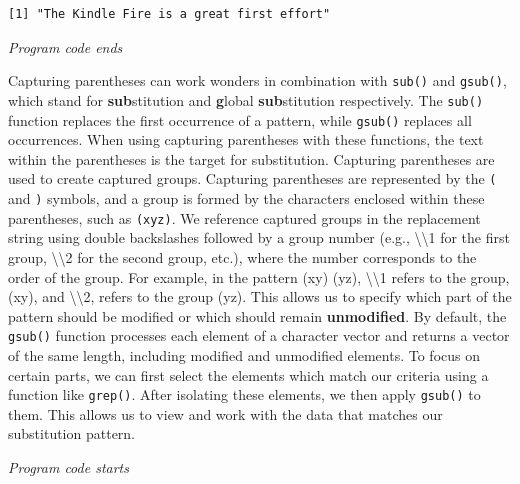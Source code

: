 \begin{verbatim}
[1] "The Kindle Fire is a great first effort"
\end{verbatim}

\emph{Program code ends}

Capturing parentheses can work wonders in combination with
\texttt{sub()} and \texttt{gsub()}, which stand for
\textbf{sub}stitution and \textbf{g}lobal \textbf{sub}stitution
respectively. The \texttt{sub()} function replaces the first occurrence
of a pattern, while \texttt{gsub()} replaces all occurrences. When using
capturing parentheses with these functions, the text within the
parentheses is the target for substitution. Capturing parentheses
are used to create captured groups. Capturing parentheses are
represented by the \texttt{(} and \texttt{)} symbols, and a
group is formed by the characters enclosed within these parentheses,
such as \texttt{(xyz)}. We reference captured groups in the replacement
string using double backslashes followed by a group number (e.g.,
\textbackslash\textbackslash1 for the first group,
\textbackslash\textbackslash2 for the second group, etc.), where the
number corresponds to the order of the group. For example, in the
pattern (xy) (yz), \textbackslash\textbackslash1 refers to the group,
(xy), and \textbackslash\textbackslash2, refers to the group (yz). This
allows us to specify which part of the pattern should be
modified or which should remain \textbf{unmodified}. By default, the
\texttt{gsub()} function processes each element of a character vector
and returns a vector of the same length, including modified and
unmodified elements. To focus on certain parts, we can first select
the elements which match our criteria using a function like
\texttt{grep()}. After isolating these elements, we then apply
\texttt{gsub()} to them. This allows us to view and work with
the data that matches our substitution pattern.

\emph{Program code starts}

\begin{Shaded}
\begin{Highlighting}[]
\OtherTok{\textless{}{-}} \NormalTok{(} \NormalTok{)}

\OtherTok{\textless{}{-}} \NormalTok{(}\NormalTok{, }\SpecialCharTok{\textbackslash{}\textbackslash{}}

\end{Highlighting}
\end{Shaded}

